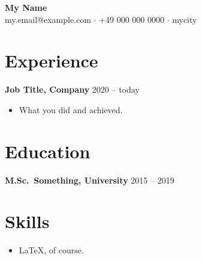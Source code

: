 \documentclass[11pt,a4paper]{article}
\newcommand{\entry}[2]{\textbf{#1} \hfill #2\par}
\begin{document}
\begin{center}
  {\LARGE \textbf{My Name}}\\[2pt]
  my.email@example.com $\cdot$ +49 000 000 0000 $\cdot$ mycity
\end{center}

\section*{Experience}
\entry{Job Title, Company}{2020 -- today}
\begin{itemize}[nosep]
  \item What you did and achieved.
\end{itemize}

\section*{Education}
\entry{M.Sc.\ Something, University}{2015 -- 2019}

\section*{Skills}
\begin{itemize}[nosep]
  \item LaTeX, of course.
\end{itemize}
\end{document}
